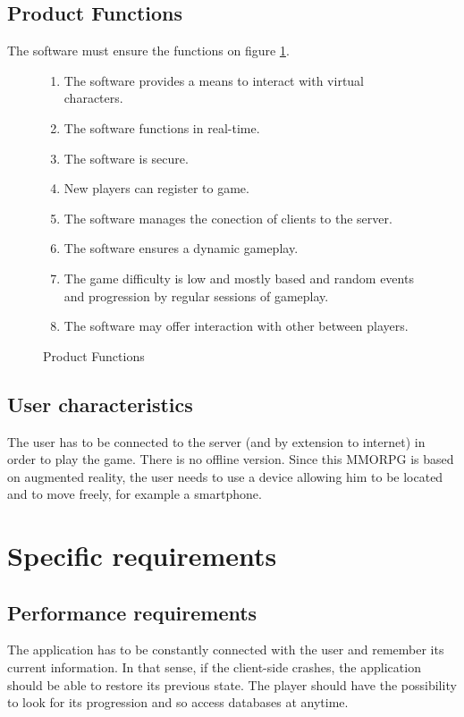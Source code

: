 \documentclass[a4paper,09pt]{article}
\begin{document}
\subsection{Product Functions}
The software must ensure the functions on figure \ref{prodfuns}.
\begin{figure}[H]
  \begin{center}
    \begin{enumerate}
    \item The software provides a means to interact with virtual characters.
    \item The software functions in real-time.
    \item The software is secure.
    \item New players can register to game.
    \item The software  manages the conection of clients to the server.
    \item The software ensures a dynamic gameplay.
    \item The game difficulty is low and mostly based and random events
      and progression by regular sessions of gameplay.
    \item The software may offer interaction with other between players.
    \end{enumerate}
    \caption{Product Functions}
    \label{prodfuns}
  \end{center}
\end{figure}

\subsection{User characteristics}

The user has to be connected to the server (and by extension to internet) in
order to play the game. There is no offline version. Since this MMORPG is based
on augmented reality, the user needs to use a device allowing him to be located
and to move freely, for example a smartphone.

\section{Specific requirements}

\subsection{Performance requirements}

The application has to be constantly connected with the user and remember its
current information.
In that sense, if the client-side crashes, the application should be able
to restore its previous state.
The player should have the possibility to look for its progression and
so access databases at anytime.
\end{document}
